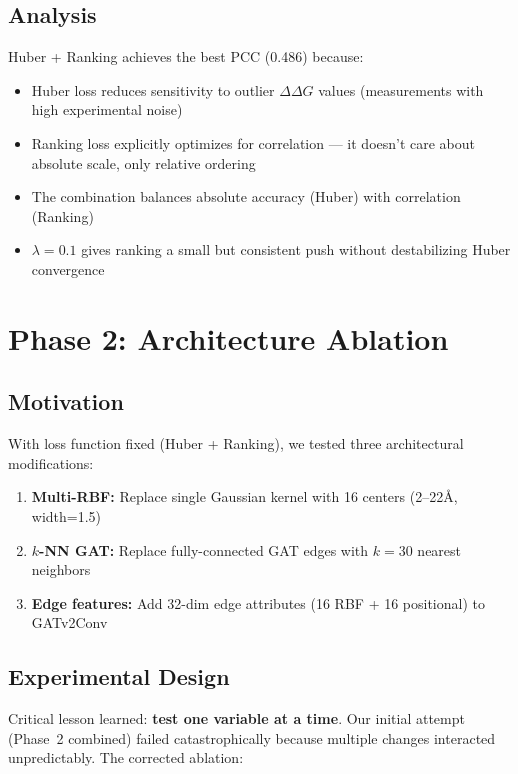 \subsection{Analysis}

Huber + Ranking achieves the best PCC (0.486) because:
\begin{itemize}
    \item Huber loss reduces sensitivity to outlier $\Delta\Delta G$ values (measurements with high experimental noise)
    \item Ranking loss explicitly optimizes for correlation --- it doesn't care about absolute scale, only relative ordering
    \item The combination balances absolute accuracy (Huber) with correlation (Ranking)
    \item $\lambda = 0.1$ gives ranking a small but consistent push without destabilizing Huber convergence
\end{itemize}

\section{Phase 2: Architecture Ablation}

\subsection{Motivation}
With loss function fixed (Huber + Ranking), we tested three architectural modifications:
\begin{enumerate}
    \item \textbf{Multi-RBF:} Replace single Gaussian kernel with 16 centers (2--22\AA, width=1.5)
    \item \textbf{$k$-NN GAT:} Replace fully-connected GAT edges with $k=30$ nearest neighbors
    \item \textbf{Edge features:} Add 32-dim edge attributes (16 RBF + 16 positional) to GATv2Conv
\end{enumerate}

\subsection{Experimental Design}

Critical lesson learned: \textbf{test one variable at a time}. Our initial attempt (Phase~2 combined) failed catastrophically because multiple changes interacted unpredictably. The corrected ablation:

